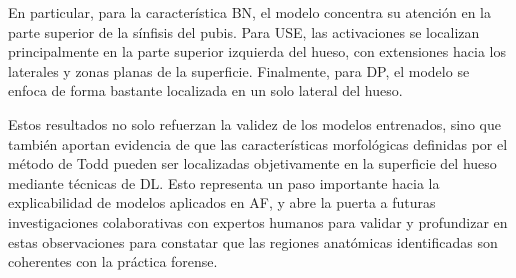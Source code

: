 En particular, para la característica BN, el modelo concentra su atención en la parte superior de la sínfisis del pubis. Para USE, las activaciones se localizan principalmente en la parte superior izquierda del hueso, con extensiones hacia los laterales y zonas planas de la superficie. Finalmente, para DP, el modelo se enfoca de forma bastante localizada en un solo lateral del hueso.

Estos resultados no solo refuerzan la validez de los modelos entrenados, sino que también aportan evidencia de que las características morfológicas definidas por el método de Todd pueden ser localizadas objetivamente en la superficie del hueso mediante técnicas de DL. Esto representa un paso importante hacia la explicabilidad de modelos aplicados en AF, y abre la puerta a futuras investigaciones colaborativas con expertos humanos para validar y profundizar en estas observaciones para constatar que las regiones anatómicas identificadas son coherentes con la práctica forense.


